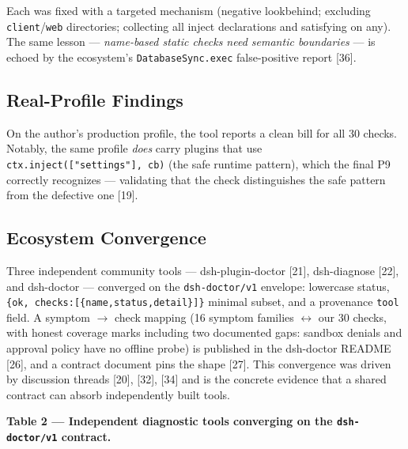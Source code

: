 \documentclass[11pt]{article}
\begin{document}
Each was fixed with a targeted mechanism (negative lookbehind; excluding
\texttt{client}/\texttt{web} directories; collecting all inject
declarations and satisfying on any). The same lesson ---
\emph{name-based static checks need semantic boundaries} --- is echoed
by the ecosystem's \texttt{DatabaseSync.exec} false-positive report
[36].

\subsection{Real-Profile Findings}\label{real-profile-findings}

On the author's production profile, the tool reports a clean bill for
all 30 checks. Notably, the same profile \emph{does} carry plugins that
use \texttt{ctx.inject(["settings"],\ cb)} (the safe runtime
pattern), which the final P9 correctly recognizes --- validating that
the check distinguishes the safe pattern from the defective one
[19].

\subsection{Ecosystem Convergence}\label{ecosystem-convergence}

Three independent community tools --- dsh-plugin-doctor [21],
dsh-diagnose [22], and dsh-doctor --- converged on the
\texttt{dsh-doctor/v1} envelope: lowercase status,
\texttt{\{ok,\ checks:[\{name,status,detail\}]\}} minimal subset,
and a provenance \texttt{tool} field. A symptom $\to$ check mapping (16
symptom families  $\leftrightarrow$  our 30 checks, with honest coverage marks including
two documented gaps: sandbox denials and approval policy have no offline
probe) is published in the dsh-doctor README [26], and a contract
document pins the shape [27]. This convergence was driven by
discussion threads [20], [32], [34] and is the concrete
evidence that a shared contract can absorb independently built tools.

\textbf{Table 2 --- Independent diagnostic tools converging on the
\texttt{dsh-doctor/v1} contract.}

\begin{table}[H]
\centering
\caption{Independent diagnostic tools converging on the \texttt{dsh-doctor/v1} contract.}
\label{tab:tools}
\end{table}
\end{document}
